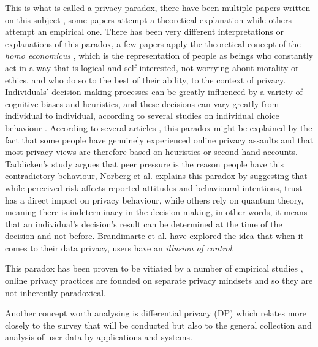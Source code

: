 This is what is called a privacy paradox, there have been multiple papers
written on this subject \cite{solove2021myth, WilliamsPrivacy, lee2021investigating, goad2021privacy, gerber2018explaining},
some papers attempt a theoretical explanation while others attempt an empirical
one. There has been very different interpretations or explanations of this
paradox, a few papers \cite{wilson2012unpacking, warshaw2015can, lee2015privacy}
apply the theoretical concept of the \textit{homo economicus} \cite{zak2008moral},
which is the representation of people as beings who constantly act in a
way that is logical and self-interested, not worrying about morality or
ethics, and who do so to the best of their ability, to the context of privacy.
Individuals' decision-making processes can be greatly influenced by a variety
of cognitive biases and heuristics, and these decisions can vary greatly from
individual to individual, according to several studies on individual choice behaviour \cite{knijnenburg2013dimensionality, wakefield2013influence, flender2012type}.
According to several articles \cite{dienlin2015privacy, baek2014solving},
this paradox might be explained by the fact that some people have genuinely
experienced online privacy assaults and that most privacy views are therefore
based on heuristics or second-hand accounts. Taddicken's study \cite{taddicken2014privacy}
argues that peer pressure is the reason people have this contradictory behaviour,
Norberg et al. \cite{norberg2007privacy} explains this paradox by suggesting
that while perceived risk affects reported attitudes and behavioural intentions,
trust has a direct impact on privacy behaviour, while others \cite{flender2012type, kokolakis2017privacy}
rely on quantum theory, meaning there is indeterminacy in the decision making,
in other words, it means that an individual's decision's result can be determined
at the time of the decision and not before. Brandimarte et al. \cite{brandimarte2013misplaced}
have explored the idea that when it comes to their data privacy, users have
an \textit{illusion of control}.

This paradox has been proven to be vitiated by a number of empirical studies \cite{dienlin2015privacy, xie2019consumers, SCHWAIG20131, sannon2018privacy},
online privacy practices are founded on separate privacy mindsets and so
they are not inherently paradoxical.

Another concept worth analysing is differential privacy (DP) which relates more
closely to the survey that will be conducted but also to the general
collection and analysis of user data by applications and systems.

